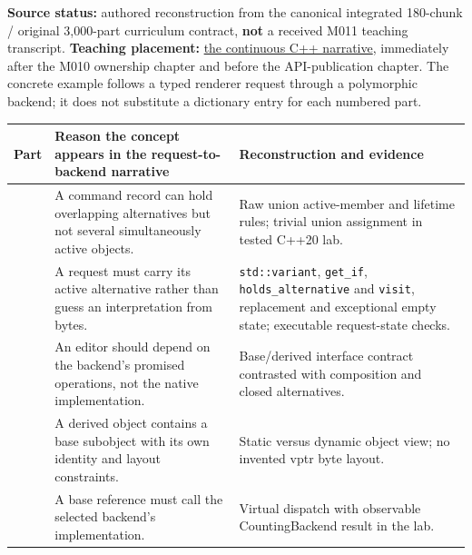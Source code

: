 \textbf{Source status:} authored reconstruction from the canonical integrated 180-chunk / original 3,000-part curriculum contract, \textbf{not} a received M011 teaching transcript. \textbf{Teaching placement:} \hyperref[01-foundations-i-ch004-from-one-owned-resource-to-many-requests-and-a-replaceable-backend]{the continuous C++ narrative}, immediately after the M010 ownership chapter and before the API-publication chapter. The concrete example follows a typed renderer request through a polymorphic backend; it does not substitute a dictionary entry for each numbered part.

{\def\LTcaptype{none} %
\begin{longtable}[]{@{}
  >{\raggedright\arraybackslash}p{}
  >{\raggedright\arraybackslash}p{}
  >{\raggedright\arraybackslash}p{}@{}}
\toprule\noalign{}
\begin{minipage}[b]{\linewidth}\raggedright
Part
\end{minipage} & \begin{minipage}[b]{\linewidth}\raggedright
Reason the concept appears in the request-to-backend narrative
\end{minipage} & \begin{minipage}[b]{\linewidth}\raggedright
Reconstruction and evidence
\end{minipage} \\
\midrule\noalign{}
\endhead
\bottomrule\noalign{}
\endlastfoot
161 & A command record can hold overlapping alternatives but not several simultaneously active objects. & Raw union active-member and lifetime rules; trivial union assignment in tested C++20 lab. \\
162 & A request must carry its active alternative rather than guess an interpretation from bytes. & \texttt{std::variant}, \texttt{get\_if}, \texttt{holds\_alternative} and \texttt{visit}, replacement and exceptional empty state; executable request-state checks. \\
163 & An editor should depend on the backend's promised operations, not the native implementation. & Base/derived interface contract contrasted with composition and closed alternatives. \\
164 & A derived object contains a base subobject with its own identity and layout constraints. & Static versus dynamic object view; no invented vptr byte layout. \\
165 & A base reference must call the selected backend's implementation. & Virtual dispatch with observable CountingBackend result in the lab. \\

\end{longtable}}
